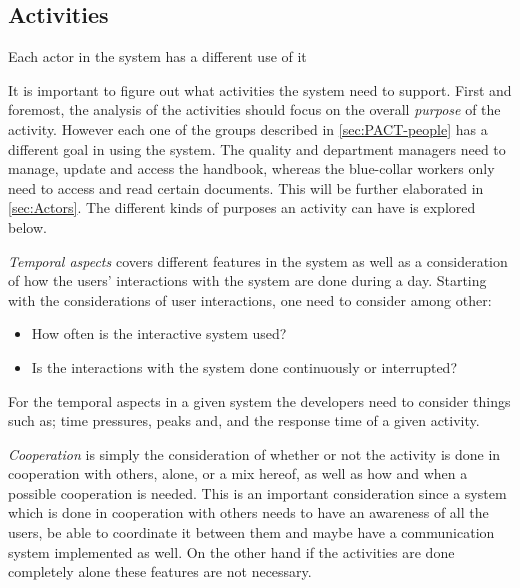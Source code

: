 \subsection{Activities}\label{sec:PACT-actvities}
Each actor in the system has a different use of it

It is important to figure out what activities the system need to support.
First and foremost, the analysis of the activities should focus on the overall \textit{purpose} of the activity.
However each one of the groups described in \cref{sec:PACT-people} has a different goal in using the system.
The quality and department managers need to manage, update and access the handbook, whereas the blue-collar workers only need to access and read certain documents.
This will be further elaborated in \cref{sec:Actors}.
The different kinds of purposes an activity can have is explored below.


\textit{Temporal aspects} covers different features in the system as well as a consideration of how the users' interactions with the system are done during a day.
Starting with the considerations of user interactions, one need to consider among other:

\begin{itemize}
	\item How often is the interactive system used?
	\item Is the interactions with the system done continuously or interrupted?
\end{itemize}

For the temporal aspects in a given system the developers need to consider things such as; time pressures, peaks and, and the response time of a given activity.

\textit{Cooperation} is simply the consideration of whether or not the activity is done in cooperation with others, alone, or a mix hereof, as well as how and when a possible cooperation is needed.
This is an important consideration since a system which is done in cooperation with others needs to have an awareness of all the users, be able to coordinate it between them and maybe have a communication system implemented as well.
On the other hand if the activities are done completely alone these features are not necessary.


